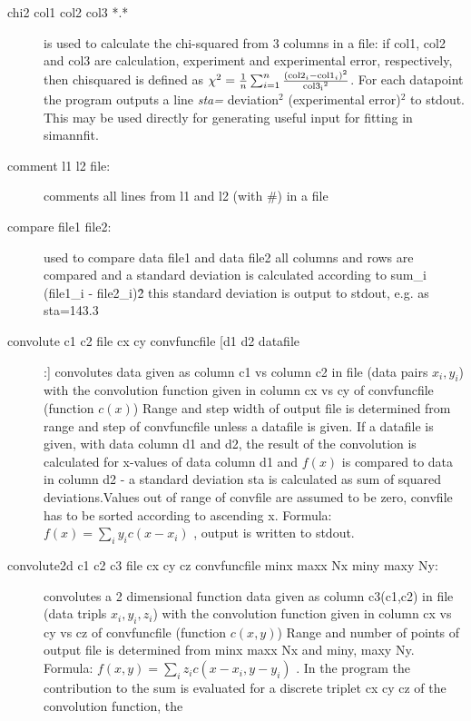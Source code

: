 \begin{description}
\item [\prg chi2 col1 col2 col3 *.*] is used to calculate the 
 chi-squared from 3 columns in a file: if col1, col2 and col3 are calculation, 
 experiment and experimental error, respectively, then
  chisquared is defined as $\chi^2=\frac{1}{n}\sum_{i=1}^n \frac{({\rm col2}_i-{\rm %
col1}_i)^2}{{\rm col3_i}^2}$. For each datapoint the program outputs a line
{\em sta=} deviation$^2$  (experimental error)$^2$ to stdout. This may be 
used directly for generating useful input for fitting in {\prg simannfit}.
\item [\prg comment l1 l2 file:] comments all lines from l1 and l2  (with \#) in a file
\item [\prg compare file1 file2:] used to compare data file1 and data file2
                all columns and rows are compared and a standard deviation
                is calculated according to sum\_i (file1\_i - file2\_i)\^2
                this standard deviation is output to stdout, e.g. as sta=143.3
\item [\prg convolute c1 c2 file cx cy convfuncfile [d1 d2 datafile]:] %
convolutes data given as column c1 vs column
                       c2 in file (data pairs $x_i,y_i$) with the convolution function given in %
column cx vs cy
		        of convfuncfile (function $c(x)$)
		       Range and step width of output file is determined from range and step 
		        of convfuncfile  unless a datafile is given. If a datafile is given, 
		     with data column d1 and d2, the result of the convolution is
		     calculated for x-values of data column d1 and $f(x)$ is compared to
		     data in column d2 - a standard deviation sta is calculated as
		     sum of squared deviations.Values out of range of convfile are assumed to be zero,
			convfile has to be sorted according to ascending x.
			Formula: $f(x)=\sum_i y_i c(x-x_i)$ , 
		       output is written to stdout. 
\item [\prg convolute2d c1 c2 c3 file cx cy cz convfuncfile minx maxx Nx miny maxy Ny:] 
convolutes a 2 dimensional function data given as column c3(c1,c2) in file (data tripls $x_i,y_i, z_i$) with the convolution function given in column cx vs cy vs cz
		        of convfuncfile (function $c(x,y)$)
		       Range and number of points of output file is determined from minx maxx Nx and 
                        miny, maxy Ny.
			Formula: $f(x,y)=\sum_i z_i c(x-x_i,y-y_i)$ . In the program the contribution to
                        the sum is evaluated for a discrete triplet cx cy cz of the convolution function, the 

\end{description}
